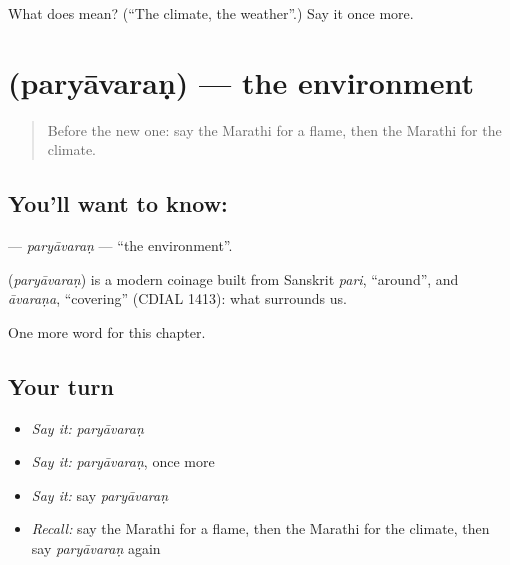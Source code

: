 \begin{tcolorbox}[breakable,colback=teal!4,colframe=teal!35!black,title={Before you move on}]
What does  mean? (\textquotedblleft{}The climate, the weather\textquotedblright{}.) Say it once more.
\end{tcolorbox}
\section[\texorpdfstring{\mr{पर्यावरण} (paryāvaraṇ)}{पर्यावरण (paryāvaraṇ)}]{ (paryāvaraṇ) — the environment}

\label{lesson:MR-C184-paryavaran}



\begin{quote}
Before the new one: say the Marathi for a flame, then the Marathi for the climate.
\end{quote}

\subsection*{You'll want to know: }
\textbf{} — \emph{paryāvaraṇ} — \textquotedblleft{}the environment\textquotedblright{}.

\begin{cousinweb}
\textbf{} (\emph{paryāvaraṇ}) is a modern coinage built from Sanskrit \emph{pari}, \textquotedblleft{}around\textquotedblright{}, and \emph{āvaraṇa}, \textquotedblleft{}covering\textquotedblright{} (CDIAL 1413): what surrounds us.
\end{cousinweb}

\begin{grammarlens}[title={What you've built}]
One more word for this chapter.
\end{grammarlens}

\subsection*{Your turn}
\begin{itemize}
\raggedright
  \item \emph{Say it:} \emph{paryāvaraṇ}
  \item \emph{Say it:} \emph{paryāvaraṇ}, once more
  \item \emph{Say it:} say \emph{paryāvaraṇ}
  \item \emph{Recall:} say the Marathi for a flame, then the Marathi for the climate, then say \emph{paryāvaraṇ} again
\end{itemize}

